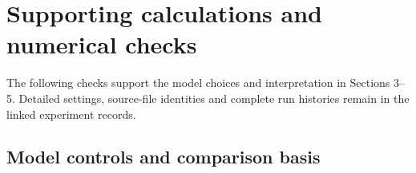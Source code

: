 \documentclass[12pt]{article}
\begin{document}
\endgroup
\clearpage\ESBappendix
\renewcommand{\thefigure}{\thesection\arabic{figure}}
\renewcommand{\thetable}{\thesection\arabic{table}}
\section{Supporting calculations and numerical checks}\label{appendix-a.-supporting-calculations-and-numerical-checks}

The following checks support the model choices and interpretation in Sections 3--5. Detailed settings, source-file identities and complete run histories remain in the linked experiment records.

\subsection{Model controls and comparison basis}\label{a.1.-model-controls-and-comparison-basis}
\end{document}
